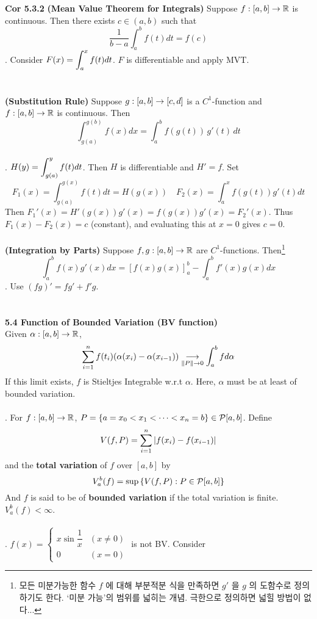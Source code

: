 \textbf{Cor 5.3.2} \textbf{(Mean Value Theorem for Integrals)} Suppose $f:[a, b]\rightarrow\mathbb{R}$ is continuous. Then there exists $c\in (a, b)$ such that
$$\frac{1}{b-a}\int_a^b f(t)dt = f(c)$$
\pf. Consider $F(x) = \displaystyle\int_a^x f(t)dt$. $F$ is differentiable and apply MVT.\\
\\
\\
 \textbf{(Substitution Rule)} Suppose $g:[a, b]\rightarrow[c, d]$ is a $C^1$-function and $f:[a, b]\rightarrow\mathbb{R}$ is continuous. Then
$$\int_{g(a)}^{g(b)}f(x)dx = \int_a^b f(g(t))\,g'(t)\,dt$$
\\
\pf. $\displaystyle H(y) = \int_{g(a)}^y f(t)dt$. Then $H$ is differentiable and $H'=f$. Set $$F_1(x) = \int_{g(a)}^{g(x)}f(t)dt = H(g(x)) \quad F_2(x) = \int_a^x f(g(t))g'(t)dt$$
Then $F_1'(x) = H'(g(x))g'(x) = f(g(x))g'(x) = F_2'(x)$. Thus $F_1(x) - F_2(x) = c$ (constant), and evaluating this at $x=0$ gives $c = 0$.
\\
\\
 \textbf{(Integration by Parts)} Suppose $f, g:[a, b]\rightarrow\mathbb{R}$ are $C^1$-functions. Then\footnote{모든 미분가능한 함수 $f$ 에 대해 부분적분 식을 만족하면 $g'$ 을 $g$ 의 도함수로 정의하기도 한다. `미분 가능'의 범위를 넓히는 개념. 극한으로 정의하면 넓힐 방법이 없다...}
$$\int_a^b f(x)g'(x) dx = \left[f(x)g(x)\right]_a^b - \int_a^b f'(x)g(x)dx$$
\pf. Use $(fg)' = fg' + f'g$.
\\\\\\
\textbf{5.4 Function of Bounded Variation (BV function)}\\
Given $\alpha: [a, b]\rightarrow\mathbb{R}$, $$\sum_{i=1}^n f(t_i)(\alpha(x_i) - \alpha(x_{i-1})) \underset{\left\lVert P\right\rVert\rightarrow 0}{\longrightarrow} \int_a^b f d\alpha $$
If this limit exists, $f$ is Stieltjes Integrable w.r.t $\alpha$. Here, $\alpha$ must be at least of bounded variation.\\
\\
. For $f:[a, b]\rightarrow\mathbb{R}$, $P = \{a=x_0 < x_1 < \cdots < x_n=b\} \in \mathcal{P}[a, b]$. Define $$V(f, P) = \sum_{i=1}^n \left|f(x_i) - f(x_{i-1})\right|$$
and the \textbf{total variation} of $f$ over $[a, b]$ by
$$V_a^b(f) = \sup \left\{V(f, P): P \in \mathcal{P}[a, b]\right\}$$
And $f$ is said to be of \textbf{bounded variation} if the total variation is finite. $V_a^b(f) < \infty$.\\
\\
\ex. $f(x) = \begin{cases}
	x\sin \dfrac{1}{x} & (x \neq 0) \\ 0 & (x = 0)
\end{cases}$ is not BV. Consider
